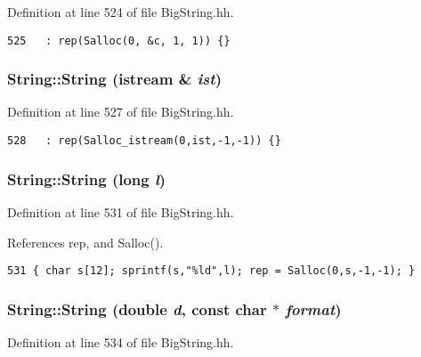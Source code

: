 Definition at line 524 of file Big\-String.hh.



\footnotesize\begin{verbatim}525   : rep(Salloc(0, &c, 1, 1)) {}
\end{verbatim}\normalsize 
{}
\subsubsection{\setlength{\rightskip}{0pt plus 5cm}String::String (istream \& {\em ist})\hspace{0.3cm}{\tt  [inline]}}\label{classString_a6}




Definition at line 527 of file Big\-String.hh.



\footnotesize\begin{verbatim}528   : rep(Salloc_istream(0,ist,-1,-1)) {}
\end{verbatim}\normalsize 
{}
\subsubsection{\setlength{\rightskip}{0pt plus 5cm}String::String (long {\em l})\hspace{0.3cm}{\tt  [inline]}}\label{classString_a7}




Definition at line 531 of file Big\-String.hh.

References rep, and Salloc().



\footnotesize\begin{verbatim}531 { char s[12]; sprintf(s,"%ld",l); rep = Salloc(0,s,-1,-1); }
\end{verbatim}\normalsize 
{}
\subsubsection{\setlength{\rightskip}{0pt plus 5cm}String::String (double {\em d}, const char $\ast$ {\em format})\hspace{0.3cm}{\tt  [inline]}}\label{classString_a8}




Definition at line 534 of file Big\-String.hh.

